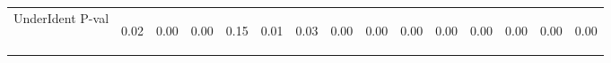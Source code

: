 \begin{center}
\begin{tabular}{lcccccccccccccc}
UnderIdent P-val & \begin{normalsize}0.02\end{normalsize} & \begin{normalsize}0.00\end{normalsize} & \begin{normalsize}0.00\end{normalsize} & \begin{normalsize}0.15\end{normalsize} & \begin{normalsize}0.01\end{normalsize} & \begin{normalsize}0.03\end{normalsize} & \begin{normalsize}0.00\end{normalsize} & \begin{normalsize}0.00\end{normalsize} & \begin{normalsize}0.00\end{normalsize} & \begin{normalsize}0.00\end{normalsize} & \begin{normalsize}0.00\end{normalsize} & \begin{normalsize}0.00\end{normalsize} & \begin{normalsize}0.00\end{normalsize} & \begin{normalsize}0.00\end{normalsize}\\

\end{tabular}
\end{center}
